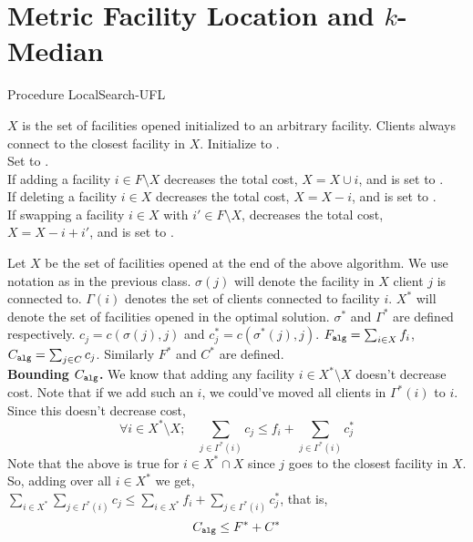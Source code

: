 \documentclass[11pt]{article}
\def\alg{{\tt alg}}
\newlength{\algobox}
\begin{document}
\section{Metric Facility Location and $k$-Median}

\vspace{2ex}\noindent
\begin{boxedminipage}{\algobox}
Procedure {\sc LocalSearch-UFL}
\begin{algorithmic}[1]
  \STATE $X$ is the set of facilities opened initialized to an arbitrary facility. Clients always connect to the 
              closest facility in $X$. Initialize \loc to  \false.\\
  	\STATE Set \loc to \true. \\
  	 If adding a facility $i \in F\setminus X$ decreases the total cost, $X=X\cup i$, 						  and	 \loc is set to \false.\\
	 If deleting a facility $i \in X$ decreases the total cost, $X=X-i$, and 
						     \loc is set to \false.\\
          If swapping a facility $i \in X$ with $i'\in F\setminus X$, decreases the total cost,  					  $X=X - i + i'$, and \loc is set to \false.
\ENDWHILE
\end{algorithmic}
\end{boxedminipage}
\vspace{1ex}

Let $X$ be the set of facilities opened at the end of the above algorithm. We use notation as in the previous class. $\sigma(j)$ will denote the facility in $X$ client $j$ is connected to. $\Gamma(i)$ denotes the set of clients connected to facility $i$. $X^*$ will denote the set of facilities opened in the optimal solution. $\sigma^*$ and $\Gamma^*$ are defined respectively. $c_j = c(\sigma(j),j)$ and $c^*_j = c(\sigma^*(j),j)$.
$F_{\alg} = \sum_{i\in X}f_i$, $C_{\alg} = \sum_{j\in C} c_j$. Similarly $F^*$ and $C^*$ are defined. \\

\noindent
{\bf Bounding $C_{\alg}$.}
We know that adding any facility $i\in X^*\setminus X$ doesn't decrease cost. Note that if we add such an $i$,
we could've moved all clients in $\Gamma^*(i)$ to $i$. Since this doesn't decrease cost,
$$\forall i\in X^*\setminus X; ~~~~ \sum_{j\in \Gamma^*(i)}c_j \le f_i + \sum_{j\in \Gamma^*(i)} c^*_j$$
Note that the above is true for $i\in X^*\cap X$ since $j$ goes to the closest facility in $X$. 
So, adding over all $i\in X^*$ we get,
$\sum_{i\in X^*} \sum_{j\in \Gamma^*(i)} c_j \le \sum_{i\in X^*} f_i +\sum_{j\in \Gamma^*(i)} c^*_j$, that is,
$$C_{\alg} \le F^* + C^*$$ 
\end{document}
